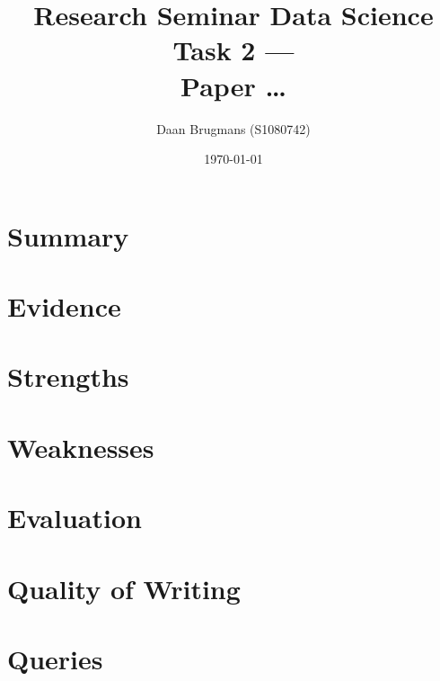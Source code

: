\documentclass{article}
\begin{document}
\title{Research Seminar Data Science Task 2 ---\\Paper \dots}
\author{Daan Brugmans (S1080742)}
\date{\today}

\maketitle

\section{Summary}

\section{Evidence}

\section{Strengths}

\section{Weaknesses}

\section{Evaluation}

\section{Quality of Writing}

\section{Queries}
\end{document}
